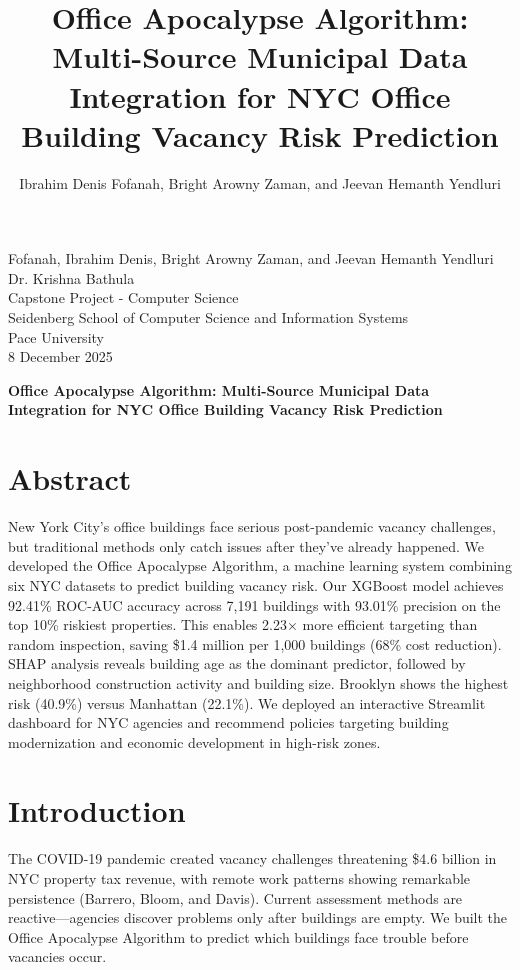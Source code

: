 \documentclass[12pt,letterpaper]{article}
\title{Office Apocalypse Algorithm: Multi-Source Municipal Data Integration for NYC Office Building Vacancy Risk Prediction}
\author{Ibrahim Denis Fofanah, Bright Arowny Zaman, and Jeevan Hemanth Yendluri}
\date{}
\begin{document}
\noindent Fofanah, Ibrahim Denis, Bright Arowny Zaman, and Jeevan Hemanth Yendluri \\
Dr. Krishna Bathula \\
Capstone Project - Computer Science \\
Seidenberg School of Computer Science and Information Systems \\
Pace University \\
8 December 2025

\begin{center}
\textbf{Office Apocalypse Algorithm: Multi-Source Municipal Data Integration for NYC Office Building Vacancy Risk Prediction}
\end{center}

\section*{Abstract}

New York City's office buildings face serious post-pandemic vacancy challenges, but traditional methods only catch issues after they've already happened. We developed the Office Apocalypse Algorithm, a machine learning system combining six NYC datasets to predict building vacancy risk. Our XGBoost model achieves 92.41\% ROC-AUC accuracy across 7,191 buildings with 93.01\% precision on the top 10\% riskiest properties. This enables 2.23× more efficient targeting than random inspection, saving \$1.4 million per 1,000 buildings (68\% cost reduction). SHAP analysis reveals building age as the dominant predictor, followed by neighborhood construction activity and building size. Brooklyn shows the highest risk (40.9\%) versus Manhattan (22.1\%). We deployed an interactive Streamlit dashboard for NYC agencies and recommend policies targeting building modernization and economic development in high-risk zones.

\section*{Introduction}

The COVID-19 pandemic created vacancy challenges threatening \$4.6 billion in NYC property tax revenue, with remote work patterns showing remarkable persistence (Barrero, Bloom, and Davis). Current assessment methods are reactive—agencies discover problems only after buildings are empty. We built the Office Apocalypse Algorithm to predict which buildings face trouble before vacancies occur.
\end{document}
